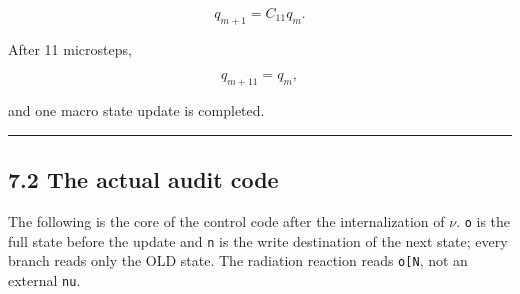 \documentclass[
  a4paper,
]{article}
\begin{document}
\[
\boxed{
q_{m+1}=C_{11}q_m.
}
\]

After 11 microsteps,

\[
q_{m+11}=q_m,
\]

and one macro state update is completed.

\begin{center}\rule{0.5\linewidth}{0.5pt}\end{center}

\subsection{7.2 The actual audit code}\label{the-actual-audit-code}

The following is the core of the control code after the internalization
of \(\nu\). \texttt{o} is the full state before the update and
\texttt{n} is the write destination of the next state; every branch
reads only the OLD state. The radiation reaction reads
\texttt{o{[}\textquotesingle{}N\textquotesingle{}{]}}, not an external
\texttt{nu}.
\end{document}
